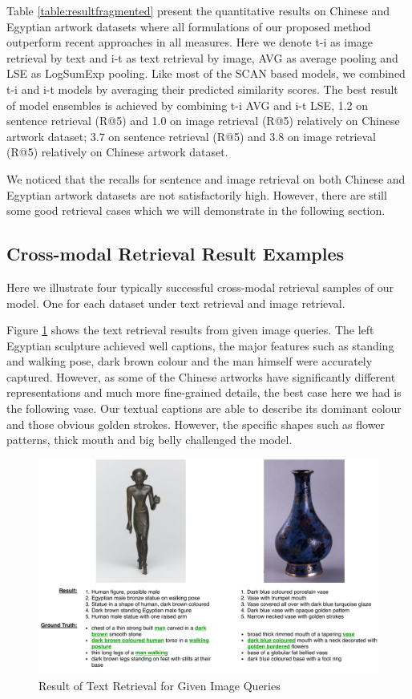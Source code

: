 Table \ref{table:resultfragmented} present the quantitative results on Chinese and Egyptian artwork datasets where all formulations of our proposed method outperform recent approaches in all measures. Here we denote t-i as image retrieval by text and i-t as text retrieval by image, AVG as average pooling and LSE as LogSumExp pooling. Like most of the SCAN based models, we combined t-i and i-t models by averaging their predicted similarity scores. The best result of model ensembles is achieved by combining t-i AVG and i-t LSE, 1.2 on sentence retrieval (R@5) and 1.0 on image retrieval (R@5) relatively on Chinese artwork dataset; 3.7 on sentence retrieval (R@5) and 3.8 on image retrieval (R@5) relatively on Chinese artwork dataset.

We noticed that the recalls for sentence and image retrieval on both Chinese and Egyptian artwork datasets are not satisfactorily high. However, there are still some good retrieval cases which we will demonstrate in the following section.

\subsection{Cross-modal Retrieval Result Examples}
Here we illustrate four typically successful cross-modal retrieval samples of our model. One for each dataset under text retrieval and image retrieval. 

Figure \ref{fig:i2t} shows the text retrieval results from given image queries. The left Egyptian sculpture achieved well captions, the major features such as standing and walking pose, dark brown colour and the man himself were accurately captured. However, as some of the Chinese artworks have significantly different representations and much more fine-grained details, the best case here we had is the following vase. Our textual captions are able to describe its dominant colour and those obvious golden strokes. However, the specific shapes such as flower patterns, thick mouth and big belly challenged the model.

\begin{figure}[h!]
\centering
\includegraphics[width=\textwidth]{i2t.pdf}
\caption{Result of Text Retrieval for Given Image Queries}
\label{fig:i2t}
\end{figure}


